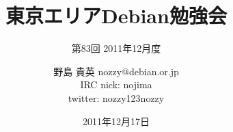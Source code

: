 




\documentclass[cjk,dvipdfmx,12pt]{beamer}
\usepackage{monthlypresentation}



\title{東京エリアDebian勉強会}
\subtitle{第83回 2011年12月度}
\author{野島 貴英 nozzy@debian.or.jp\\IRC nick: nojima\\twitter: nozzy123nozzy}
\date{2011年12月17日}



